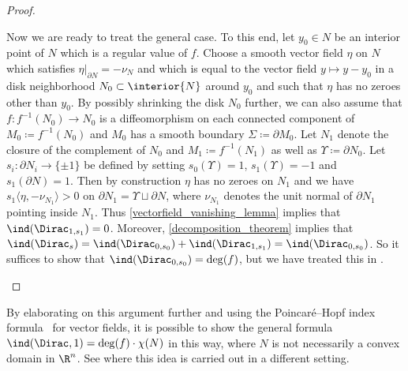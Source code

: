 \documentclass[a4paper,11pt]{amsart}
\numberwithin{equation}{section}
\begin{document}
\begin{proof}
\begin{enumerate*}[resume]
    \item Now we are ready to treat the general case.
    To this end, let \(y_0 \in N\) be an interior point of \(N\) which is a regular value of \(f\). 
    Choose a smooth vector field \(\eta\) on \(N\) which satisfies \(\eta|_{\partial N} = -\nu_N\) and which is equal to the vector field \(y \mapsto y - y_0\) in a disk neighborhood \(N_0 \subset \interior{N}\) around \(y_0\) and such that \(\eta\) has no zeroes other than \(y_0\).
    By possibly shrinking the disk \(N_0\) further, we can also assume that \(f \colon f^{-1}(N_0) \to N_0\) is a diffeomorphism on each connected component of \(M_0 \coloneqq f^{-1}(N_0)\) and \(M_0\) has a smooth boundary \(\Sigma \coloneqq \partial M_0\).
    Let \(N_1\) denote the closure of the complement of \(N_0\) and \(M_1 \coloneqq f^{-1}(N_1)\) as well as \(\Upsilon \coloneqq \partial N_0\).
    Let \(s_i \colon \partial N_i \to \{\pm 1\}\) be defined by setting \(s_0(\Upsilon) = 1\), \(s_1(\Upsilon) = -1\) and \(s_1(\partial N) = 1\).
    Then by construction \(\eta\) has no zeroes on \(N_1\) and we have \(s_1 \langle \eta, -\nu_{N_1} \rangle > 0\) on \(\partial N_1 = \Upsilon \sqcup \partial N\), where \(\nu_{N_1}\) denotes the unit normal of \(\partial N_1\) pointing inside \(N_1\).
    Thus \cref{vectorfield_vanishing_lemma} implies that \(\ind(\Dirac_{1, s_1}) = 0\).
    Moreover, \cref{decomposition_theorem} implies that \(\ind(\Dirac_{s}) = \ind(\Dirac_{0,s_0}) + \ind(\Dirac_{1,s_1}) = \ind(\Dirac_{0,s_0})\).
    So it suffices to show that \(\ind(\Dirac_{0,s_0}) = \deg(f)\), but we have treated this in .
\end{enumerate*}
\end{proof}

\begin{remark}
    By elaborating on this argument further and using the Poincaré--Hopf index formula~\cite{Hopf:Vektorfelder} for vector fields, it is possible to show the general formula \(\ind(\Dirac, 1) = \deg(f) \cdot \chi(N)\) in this way, where \(N\) is not necessarily a convex domain in \(\R^n\).
    See \textcite{tony2024scalar} where this idea is carried out in a different setting.
\end{remark}
\end{document}
